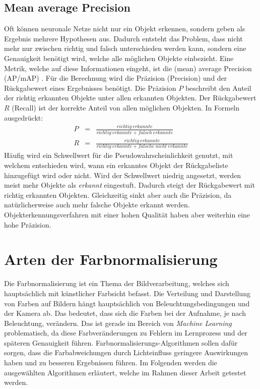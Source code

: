   \subsection{Mean average Precision}\label{s.map}
Oft können neuronale Netze nicht nur ein Objekt erkennen, sondern geben als Ergebnis mehrere Hypothesen aus. Dadurch entsteht das Problem, dass nicht mehr nur zwischen richtig und falsch unterschieden werden kann, sondern eine Genauigkeit benötigt wird, welche alle möglichen Objekte einbezieht. Eine Metrik, welche auf diese Informationen eingeht, ist die (mean) average Precision (AP/mAP) \cite{map2019hui}. Für die Berechnung wird die Präzision (Precision) und der Rückgabewert eines Ergebnisses benötigt. Die Präzision $P$ beschreibt den Anteil der richtig erkannten Objekte unter allen erkannten Objekten. Der Rückgabewert $R$ (Recall) ist der korrekte Anteil von allen möglichen Objekten. In Formeln ausgedrückt:
\begin{eqnarray}
P&=&\frac{richtig\medspace erkannte}{richtig\medspace erkannte + falsch\medspace erkannte}\\
R&=&\frac{richtig\medspace erkannte}{richtig\medspace erkannte + falsche\medspace nicht\medspace erkannte}
\end{eqnarray}
Häufig wird ein Schwellwert für die Pseudowahrscheinlichkeit genutzt, mit welchem entschieden wird, wann ein erkanntes Objekt der Rückgabeliste hinzugefügt wird oder nicht. Wird der Schwellwert niedrig angesetzt, werden meist mehr Objekte als \textit{erkannt} eingestuft. Dadurch steigt der Rückgabewert mit richtig erkannten Objekten. Gleichzeitig sinkt aber auch die Präzision, da natürlicherweise auch mehr falsche Objekte erkannt werden. Objekterkennungsverfahren mit einer hohen Qualität haben aber weiterhin eine hohe Präzision.
\section{Arten der Farbnormalisierung}\label{s.farbnormalisierungen}  
Die Farbnormalisierung ist ein Thema der Bildverarbeitung, welches sich hauptsächlich mit künstlicher Farbsicht befasst. Die Verteilung und Darstellung von Farben auf Bildern hängt hauptsächlich von Beleuchtungsbedingungen und der Kamera ab. Das bedeutet, dass sich die Farben bei der Aufnahme, je nach Beleuchtung, verändern. Das ist gerade im Bereich von \textit{Machine Learning} problematisch, da diese Farbveränderungen zu Fehlern im Lernprozess und der späteren Genauigkeit führen. Farbnormalisierungs-Algorithmen sollen dafür sorgen, dass die Farbabweichungen durch Lichteinfluss geringere Auswirkungen haben und zu besseren Ergebnissen führen. Im Folgenden werden die ausgewählten Algorithmen erläutert, welche im Rahmen dieser Arbeit getestet werden.
